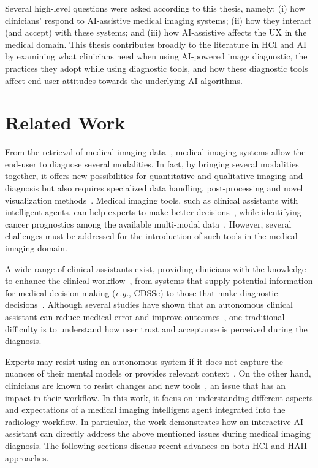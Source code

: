 Several high-level questions were asked according to this thesis, namely:
(i) how clinicians' respond to \ac{AI}-assistive medical imaging systems;
(ii) how they interact (and accept) with these systems; and
(iii) how \ac{AI}-assistive affects the \ac{UX} in the medical domain.
This thesis contributes broadly to the literature in \ac{HCI} and \ac{AI} by examining what clinicians need when using \ac{AI}-powered image diagnostic, the practices they adopt while using diagnostic tools, and how these diagnostic tools affect end-user attitudes towards the underlying \ac{AI} algorithms.

\section{Related Work}
\label{sec:sec006002}

From the retrieval of medical imaging data~\cite{faraji2019radiologic, seifabadi2019correlation}, medical imaging systems allow the end-user to diagnose several modalities.
In fact, by bringing several modalities together, it offers new possibilities for quantitative and qualitative imaging and diagnosis but also requires specialized data handling, post-processing and novel visualization methods~\cite{Igarashi:2016:IVS:2984511.2984537, Ocegueda-Hernandez:2016:CMN:2876456.2879485, Sousa:2017:VVR:3025453.3025566}.
Medical imaging tools, such as clinical assistants with intelligent agents, can help experts to make better decisions~\cite{Lopes:2017:UHC:3143820.3144118}, while identifying cancer prognostics among the available multi-modal data~\cite{lopes2018interaction}.
However, several challenges must be addressed for the introduction of such tools in the medical imaging domain.

A wide range of clinical assistants exist, providing clinicians with the knowledge to enhance the clinical workflow~\cite{Cai:2019:HTC:3290605.3300234, edge2019clinical}, from systems that supply potential information for medical decision-making ({\it e.g.}, \ac{CDSSe}) to those that make diagnostic decisions~\cite{hwang2019artificial}.
Although several studies have shown that an autonomous clinical assistant can reduce medical error and improve outcomes~\cite{Cai:2019:HTC:3290605.3300234, Cai:2019:EEE:3301275.3302289}, one traditional difficulty is to understand how user trust and acceptance is perceived during the diagnosis.

Experts may resist using an autonomous system if it does not capture the nuances of their mental models or provides relevant context~\cite{khairat2018reasons, kohli2018cad, yang2016investigating}.
On the other hand, clinicians are known to resist changes and new tools~\cite{10.1145/3132272.3134111, gagnon2014electronic}, an issue that has an impact in their workflow.
In this work, it focus on understanding different aspects and expectations of a medical imaging intelligent agent integrated into the radiology workflow.
In particular, the work demonstrates how an interactive \ac{AI} assistant can directly address the above mentioned issues during medical imaging diagnosis.
The following sections discuss recent advances on both \ac{HCI} and \ac{HAII} approaches.

